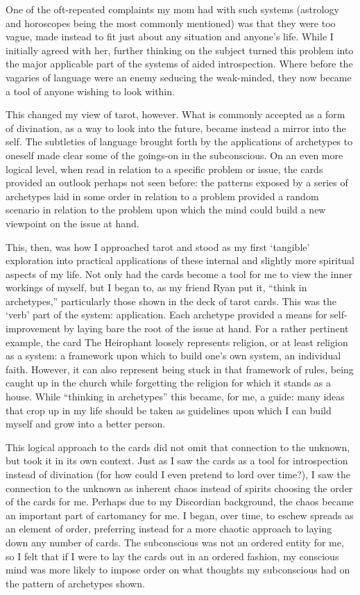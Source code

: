 \documentclass{book}
\begin{document}
One of the oft-repeated complaints my mom had with such systems (astrology and horoscopes being the most commonly mentioned) was that they were too vague, made instead to fit just about any situation and anyone's life.  While I initially agreed with her, further thinking on the subject turned this problem into the major applicable part of the systems of aided introspection.  Where before the vagaries of language were an enemy seducing the weak-minded, they now became a tool of anyone wishing to look within.

This changed my view of tarot, however.  What is commonly accepted as a form of divination, as a way to look into the future, became instead a mirror into the self.  The subtleties of language brought forth by the applications of archetypes to oneself made clear some of the goings-on in the subconscious.  On an even more logical level, when read in relation to a specific problem or issue, the cards provided an outlook perhaps not seen before: the patterns exposed by a series of archetypes laid in some order in relation to a problem provided a random scenario in relation to the problem upon which the mind could build a new viewpoint on the issue at hand.

This, then, was how I approached tarot and stood as my first `tangible' exploration into practical applications of these internal and slightly more spiritual aspects of my life.  Not only had the cards become a tool for me to view the inner workings of myself, but I began to, as my friend Ryan put it, ``think in archetypes,'' particularly those shown in the deck of tarot cards.  This was the `verb' part of the system: application.  Each archetype provided a means for self-improvement by laying bare the root of the issue at hand.  For a rather pertinent example, the card The Heirophant loosely represents religion, or at least religion as a system: a framework upon which to build one's own system, an individual faith.  However, it can also represent being stuck in that framework of rules, being caught up in the church while forgetting the religion for which it stands as a house.  While ``thinking in archetypes'' this became, for me, a guide: many ideas that crop up in my life should be taken as guidelines upon which I can build myself and grow into a better person.

This logical approach to the cards did not omit that connection to the unknown, but took it in its own context.  Just as I saw the cards as a tool for introspection instead of divination (for how could I even pretend to lord over time?), I saw the connection to the unknown as inherent chaos instead of spirits choosing the order of the cards for me.  Perhaps due to my Discordian background, the chaos became an important part of cartomancy for me.  I began, over time, to eschew spreads as an element of order, preferring instead for a more chaotic approach to laying down any number of cards.  The subconscious was not an ordered entity for me, so I felt that if I were to lay the cards out in an ordered fashion, my conscious mind was more likely to impose order on what thoughts my subconscious had on the pattern of archetypes shown.
\end{document}
